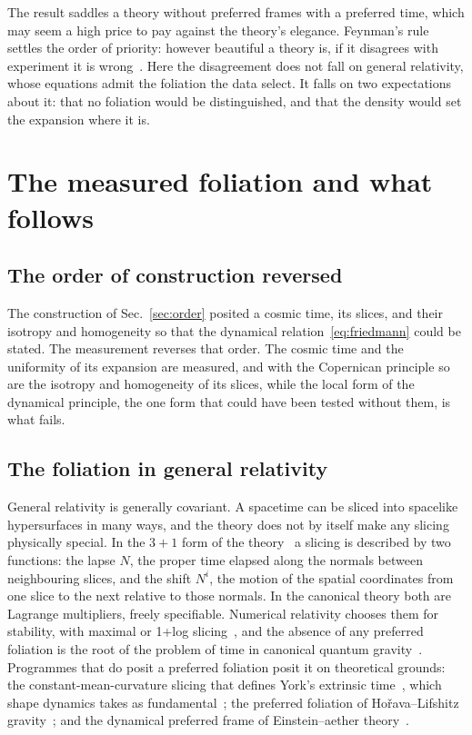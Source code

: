 \documentclass[aps,prd,reprint,amsmath,amssymb,superscriptaddress]{revtex4-2}
\begin{document}
The result saddles a theory without preferred frames with a preferred time, which may seem a high price to pay against the theory's elegance. Feynman's rule settles the order of priority: however beautiful a theory is, if it disagrees with experiment it is wrong~\cite{Feynman1965}. Here the disagreement does not fall on general relativity, whose equations admit the foliation the data select. It falls on two expectations about it: that no foliation would be distinguished, and that the density would set the expansion where it is.

\section{The measured foliation and what follows}\label{sec:follows}

\subsection{The order of construction reversed}

The construction of Sec.~\ref{sec:order} posited a cosmic time, its slices, and their isotropy and homogeneity so that the dynamical relation~\eqref{eq:friedmann} could be stated. The measurement reverses that order. The cosmic time and the uniformity of its expansion are measured, and with the Copernican principle so are the isotropy and homogeneity of its slices, while the local form of the dynamical principle, the one form that could have been tested without them, is what fails.

\subsection{The foliation in general relativity}

General relativity is generally covariant. A spacetime can be sliced into spacelike hypersurfaces in many ways, and the theory does not by itself make any slicing physically special. In the $3{+}1$ form of the theory~\cite{ADM1962} a slicing is described by two functions: the lapse $N$, the proper time elapsed along the normals between neighbouring slices, and the shift $N^{i}$, the motion of the spatial coordinates from one slice to the next relative to those normals. In the canonical theory both are Lagrange multipliers, freely specifiable. Numerical relativity chooses them for stability, with maximal or 1+log slicing~\cite{BaumgarteShapiro2010}, and the absence of any preferred foliation is the root of the problem of time in canonical quantum gravity~\cite{Kuchar1992, Isham1993}. Programmes that do posit a preferred foliation posit it on theoretical grounds: the constant-mean-curvature slicing that defines York's extrinsic time~\cite{York1972}, which shape dynamics takes as fundamental~\cite{Gomes2011}; the preferred foliation of Ho\v{r}ava--Lifshitz gravity~\cite{Horava2009}; and the dynamical preferred frame of Einstein--aether theory~\cite{Jacobson2001}.
\end{document}
